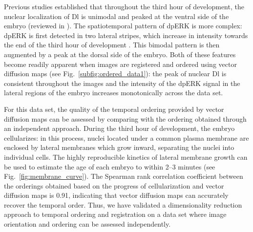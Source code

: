 \documentclass{pnastwo}
\newcommand{\fig}[0]{Fig.}
\begin{document}
\begin{article}

Previous studies established that throughout the third hour of development, the nuclear localization of Dl is unimodal and peaked at the ventral side of the embryo (reviewed in \cite{rushlow2012temporal}).
%
The spatiotemporal pattern of dpERK is more complex: dpERK is first detected in two lateral stripes, which increase in intensity towards the end of the third hour of development \cite{lim2013kinetics}.
%
This bimodal pattern is then augmented by a peak at the dorsal side of the embryo.
%
Both of these features become readily apparent when images are registered and ordered using vector diffusion maps (see \fig~\ref{subfig:ordered_data1}): the peak of nuclear Dl is consistent throughout the images and the intensity of the dpERK signal in the lateral regions of the embryo increases monotonically across the data set.
%

For this data set, the quality of the temporal ordering provided by vector diffusion maps can be assessed by comparing with the ordering obtained through an independent approach.
%
During the third hour of development, the embryo cellularizes: in this process, nuclei located under a common plasma membrane are enclosed by lateral membranes which grow inward, separating the nuclei into individual cells.
%
The highly reproducible kinetics of lateral membrane growth can be used to estimate the age of each embryo to within 2--3 minutes \cite{figard2013plasma} (see \fig~\ref{fig:membrane_curve}).
%
The Spearman rank correlation coefficient between the orderings obtained based on the progress of cellularization and vector diffusion maps is 0.91, indicating that vector diffusion maps can accurately recover the temporal order.
%
Thus, we have validated a dimensionality reduction approach to temporal ordering and registration on a data set where image orientation and ordering can be assessed independently.

%
%



\end{article}
\end{document}
